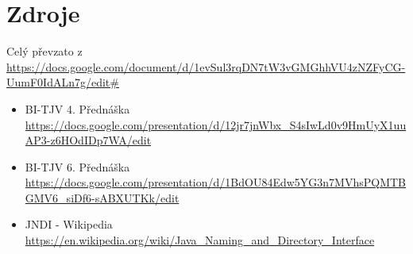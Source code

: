 \documentclass{szzclass}
\begin{document}
\section{Zdroje}
Celý převzato z \url{https://docs.google.com/document/d/1evSul3rqDN7tW3vGMGhhVU4zNZFyCG-UumF0IdALn7g/edit#}
\begin{itemize}
\item BI-TJV 4. Přednáška \url{https://docs.google.com/presentation/d/12jr7jnWbx_S4sIwLd0v9HmUyX1uuAP3-z6HOdIDp7WA/edit}
\item BI-TJV 6. Přednáška \url{https://docs.google.com/presentation/d/1BdOU84Edw5YG3n7MVhsPQMTBGMV6_siDf6-sABXUTKk/edit}
\item JNDI - Wikipedia \url{https://en.wikipedia.org/wiki/Java_Naming_and_Directory_Interface}
\end{itemize}
\end{document}
